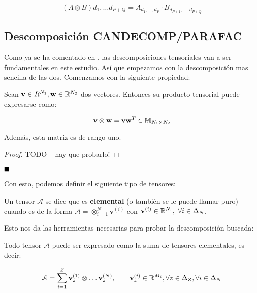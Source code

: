 $$(A \otimes B)d_1, \ldots d_{P + Q} = A_{d_1, \ldots, d_P} \cdot B_{d_{P + 1}, \ldots, d_{P + Q}}$$

\subsection{Descomposición CANDECOMP/PARAFAC}

Como ya se ha comentado en , las descomposiciones tensoriales van a ser fundamentales en este estudio. Así que empezamos con la descomposición mas sencilla de las dos. Comenzamos con la siguiente propiedad:

\begin{proposicion}
    Sean $\mathbf{v} \in R^{N_1}, \mathbf{w} \in \mathbb{R}^{N_2}$ dos vectores. Entonces su producto tensorial puede expresarse como:

    $$\mathbf{v} \otimes \mathbf{w} = \mathbf{v} \mathbf{w}^T \in \mathbb{M}_{N_1 \times N_2}$$

    Además, esta matriz es de rango uno.
\end{proposicion}

\begin{proof}

TODO -- hay que probarlo!

\end{proof}

$\customqed$

Con esto, podemos definir el siguiente tipo de tensores:

\begin{definicion}
    Un tensor $\mathcal{A}$ se dice que es \textbf{elemental} (o también se le puede llamar puro) cuando es de la forma $\mathcal{A} = \otimes_{i = 1}^N \mathbf{v}^{(i)}$ con $\mathbf{v}^{(i)} \in \mathbb{R}^{N_i},\ \forall i \in \Delta_{N}$.
\end{definicion}

Esto nos da las herramientas necesarias para probar la descomposición buscada:

\begin{proposicion}
    Todo tensor $\mathcal{A}$ puede ser expresado como la suma de tensores elementales, es decir:

    \begin{equation} \label{eq:cp_decomp}
        \mathcal{A} = \sum_{i = 1}^Z \mathbf{v}_z^{(1)} \otimes \ldots \mathbf{v}_z^{(N)},\qquad
        \mathbf{v}_z^{(i)} \in \mathbb{R}^{M_i}, \forall z \in \Delta_{Z}, \forall i \in \Delta_{N}
    \end{equation}

\end{proposicion}

